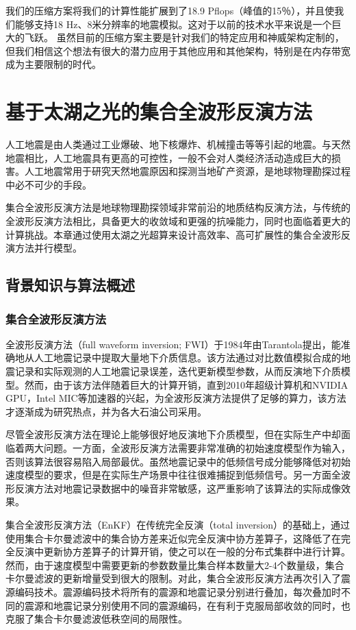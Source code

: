 \documentclass[degree=doctor]{thuthesis}
\begin{document}
我们的压缩方案将我们的计算性能扩展到了18.9 Pflops（峰值的15％），并且使我们能够支持18 Hz、8米分辨率的地震模拟。这对于以前的技术水平来说是一个巨大的飞跃。 虽然目前的压缩方案主要是针对我们的特定应用和神威架构定制的，但我们相信这个想法有很大的潜力应用于其他应用和其他架构，特别是在内存带宽成为主要限制的时代。

\chapter{基于太湖之光的集合全波形反演方法}
\label{ch:基于太湖之光的集合全波形反演方法}
人工地震是由人类通过工业爆破、地下核爆炸、机械撞击等等引起的地震。与天然地震相比，人工地震具有更高的可控性，一般不会对人类经济活动造成巨大的损害。人工地震常用于研究天然地震原因和探测当地矿产资源，是地球物理勘探过程中必不可少的手段。

集合全波形反演方法是地球物理勘探领域非常前沿的地质结构反演方法，与传统的全波形反演方法相比，具备更大的收敛域和更强的抗噪能力，同时也面临着更大的计算挑战。本章通过使用太湖之光超算来设计高效率、高可扩展性的集合全波形反演方法并行模型。

\section{背景知识与算法概述}

\subsection{集合全波形反演方法}

全波形反演方法（full waveform inversion; FWI）于1984年由Tarantola提出，能准确地从人工地震记录中提取大量地下介质信息\cite{tarantola1984inversion,plessix2012full,brossier2009seismic}。该方法通过对比数值模拟合成的地震记录和实际观测的人工地震记录误差，迭代更新模型参数，从而反演地下介质模型\cite{yushu}。然而，由于该方法伴随着巨大的计算开销，直到2010年超级计算机和NVIDIA GPU，Intel MIC等加速器的兴起，为全波形反演方法提供了足够的算力，该方法才逐渐成为研究热点，并为各大石油公司采用。

尽管全波形反演方法在理论上能够很好地反演地下介质模型，但在实际生产中却面临着两大问题。一方面，全波形反演方法需要非常准确的初始速度模型作为输入，否则该算法很容易陷入局部最优\cite{virieux2009overview}。虽然地震记录中的低频信号成分能够降低对初始速度模型的要求，但是在实际生产场景中往往很难捕捉到低频信号\cite{sirgue2006importance}。另一方面全波形反演方法对地震记录数据中的噪音非常敏感，这严重影响了该算法的实际成像效果。

集合全波形反演方法（EnKF）\cite{yushu,he2015ensemble}在传统完全反演\cite{tarantola1982generalized}（total inversion）的基础上，通过使用集合卡尔曼滤波\cite{evensen2003ensemble}中的集合协方差来近似完全反演中协方差算子，这降低了在完全反演中更新协方差算子的计算开销，使之可以在一般的分布式集群中进行计算。然而，由于速度模型中需要更新的参数数量比集合样本数量大2-4个数量级，集合卡尔曼滤波的更新增量受到很大的限制。对此，集合全波形反演方法再次引入了震源编码技术\cite{krebs2009fast}。震源编码技术将所有的震源和地震记录分别进行叠加，每次叠加时不同的震源和地震记录分别使用不同的震源编码，在有利于克服局部收敛的同时\cite{castellanos2014fast}，也克服了集合卡尔曼滤波低秩空间的局限性。
\end{document}

